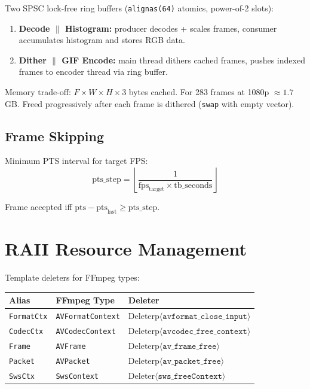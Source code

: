 \documentclass[11pt,a4paper]{article}
\begin{document}
Two SPSC lock-free ring buffers (\texttt{alignas(64)} atomics,
power-of-2 slots):

\begin{enumerate}
  \item \textbf{Decode $\parallel$ Histogram:} producer decodes + scales
        frames, consumer accumulates histogram and stores RGB data.
  \item \textbf{Dither $\parallel$ GIF Encode:} main thread dithers cached
        frames, pushes indexed frames to encoder thread via ring buffer.
\end{enumerate}

\noindent Memory trade-off: $F \times W \times H \times 3$ bytes cached.
For 283 frames at 1080p $\approx 1.7\,$GB. Freed progressively after
each frame is dithered (\texttt{swap} with empty vector).

\subsection{Frame Skipping}

Minimum PTS interval for target FPS:
\begin{equation}
  \mathrm{pts\_step} = \left\lfloor
    \frac{1}{\mathrm{fps}_{\mathrm{target}} \times \mathrm{tb\_seconds}}
  \right\rfloor
\end{equation}

Frame accepted iff $\mathrm{pts} - \mathrm{pts}_{\mathrm{last}} \geq
\mathrm{pts\_step}$.

\section{RAII Resource Management}

Template deleters for FFmpeg types:
\begin{center}
\begin{tabular}{@{}lll@{}}
\toprule
  Alias & FFmpeg Type & Deleter \\
\midrule
  \texttt{FormatCtx} & \texttt{AVFormatContext} &
    $\mathrm{Deleterp}\langle\texttt{avformat\_close\_input}\rangle$ \\
  \texttt{CodecCtx} & \texttt{AVCodecContext} &
    $\mathrm{Deleterp}\langle\texttt{avcodec\_free\_context}\rangle$ \\
  \texttt{Frame} & \texttt{AVFrame} &
    $\mathrm{Deleterp}\langle\texttt{av\_frame\_free}\rangle$ \\
  \texttt{Packet} & \texttt{AVPacket} &
    $\mathrm{Deleterp}\langle\texttt{av\_packet\_free}\rangle$ \\
  \texttt{SwsCtx} & \texttt{SwsContext} &
    $\mathrm{Deleter}\langle\texttt{sws\_freeContext}\rangle$ \\
\bottomrule
\end{tabular}
\end{center}
\end{document}
